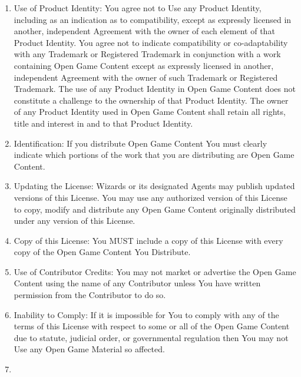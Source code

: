 {\begin{enumerate}
\item

Use of Product Identity: You agree not to Use any Product Identity, including as an indication as to compatibility, except as expressly licensed in another, independent Agreement with the owner of each element of that Product Identity. You agree not to indicate compatibility or co-adaptability with any Trademark or Registered Trademark in conjunction with a work containing Open Game Content except as expressly licensed in another, independent Agreement with the owner of such Trademark or Registered Trademark. The use of any Product Identity in Open Game Content does not constitute a challenge to the ownership of that Product Identity. The owner of any Product Identity used in Open Game Content shall retain all rights, title and interest in and to that Product Identity.

\item

Identification: If you distribute Open Game Content You must clearly indicate which portions of the work that you are distributing are Open Game Content.

\item

Updating the License: Wizards or its designated Agents may publish updated versions of this License. You may use any authorized version of this License to copy, modify and distribute any Open Game Content originally distributed under any version of this License.

\item

Copy of this License: You MUST include a copy of this License with every copy of the Open Game Content You Distribute.

\item

Use of Contributor Credits: You may not market or advertise the Open Game Content using the name of any Contributor unless You have written permission from the Contributor to do so.

\item

Inability to Comply: If it is impossible for You to comply with any of the terms of this License with respect to some or all of the Open Game Content due to statute, judicial order, or governmental regulation then You may not Use any Open Game Material so affected.

\item


\end{enumerate}}
